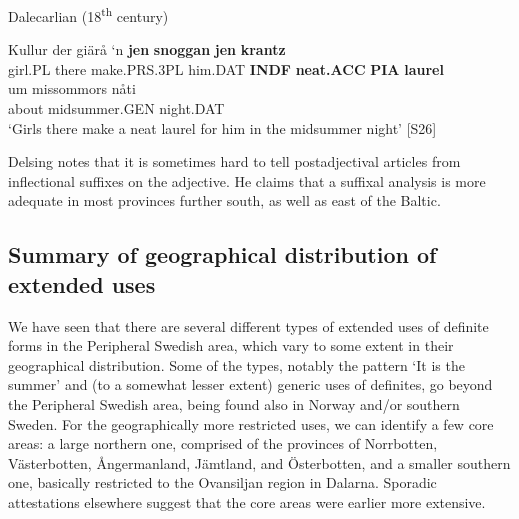 
\item 

Dalecarlian (18\textsuperscript{th} century)



 \ea\label{}
\gll Kullur  der  giärå  ‘n  \textbf{jen} \textbf{snoggan} \textbf{jen} \textbf{krantz}\\


girl.PL  there  make.PRS.3PL  him.DAT  \textbf{INDF} \textbf{neat.ACC} \textbf{PIA} \textbf{laurel}\\

 \ea\label{}
\gll um  missommors  nåti\\


about  midsummer.GEN  night.DAT\\

\glt ‘Girls there make a neat laurel for him in the midsummer night’ [S26]

\z

Delsing notes that it is sometimes hard to tell postadjectival articles from inflectional suffixes on the adjective. He claims that a suffixal analysis is more adequate in most provinces further south, as well as east of the Baltic. 


\subsection{\rmfamily Summary of geographical distribution of extended uses}

We have seen that there are several different types of extended uses of definite forms in the Peripheral Swedish area, which vary to some extent in their geographical distribution. Some of the types, notably the pattern  ‘It is the summer’  and (to a somewhat lesser extent) generic uses of definites, go beyond the Peripheral Swedish area, being found also in Norway and/or southern Sweden. For the geographically more restricted uses, we can identify a few core areas: a large northern one, comprised of the provinces of Norrbotten, Västerbotten, Ångermanland, Jämtland, and Österbotten, and a smaller southern one, basically restricted to the Ovansiljan region in Dalarna. Sporadic attestations elsewhere suggest that the core areas were earlier more extensive.


